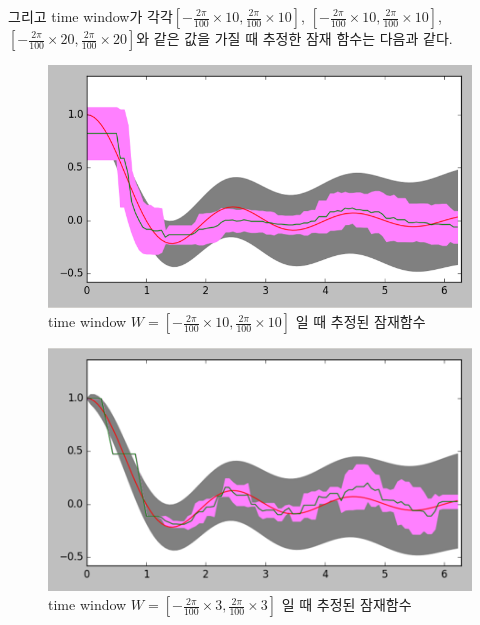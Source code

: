 \documentclass[a4paper]{oblivoir}
\begin{document}
그리고 time window가 각각$[-\frac{2 \pi}{100} \times10,\frac{2 \pi}{100} \times10]$, $[-\frac{2 \pi}{100} \times10,\frac{2 \pi}{100} \times10]$, $[-\frac{2 \pi}{100} \times20,\frac{2 \pi}{100} \times20]$와 같은 값을 가질 때 추정한 잠재 함수는 다음과 같다.\\

\begin{figure}[ht] \centering 
\includegraphics[scale=0.45]{fig12_10.png} 
\caption{time window $W = \left[-\frac{2 \pi}{100} \times10,\frac{2 \pi}{100} \times10\right]$ 일 때 추정된 잠재함수}
\label{fig:12-9}
\end{figure}

\begin{figure}[ht] \centering 
\includegraphics[scale=0.65]{fig12_11.png} 
\caption{time window $W = \left[-\frac{2 \pi}{100} \times3,\frac{2 \pi}{100} \times3\right]$ 일 때 추정된 잠재함수}
\label{fig:12-10}
\end{figure}
\end{document}
